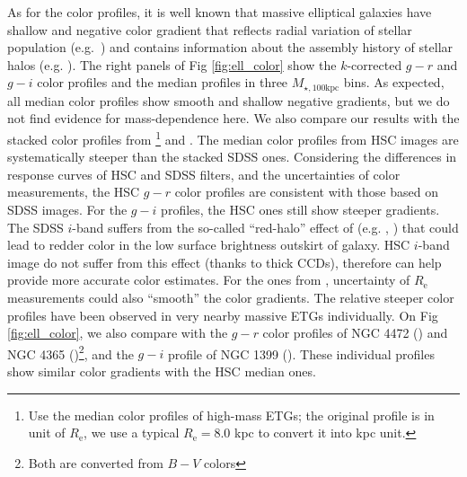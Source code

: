 \documentclass[a4paper,fleqn,usenatbib]{mnras}
\def\mtot{{$M_{\star,100\mathrm{kpc}}$}}
\begin{document}
    As for the color profiles, it is well known that massive elliptical galaxies 
    have shallow and negative color gradient that reflects radial variation of 
    stellar population (e.g.\ \citealt{Carollo1993, LaBarbera2012}) and contains 
    information about the assembly history of stellar halos (e.g. 
    \citealt{Hirschmann2015}). 
    The right panels of Fig \ref{fig:ell_color} show the $k$-corrected $g-r$ and 
    $g-i$ color profiles and the median profiles in three \mtot{} bins. 
    As expected, all median color profiles show smooth and shallow negative 
    gradients, but we do not find evidence for mass-dependence here. 
    We also compare our results with the stacked color profiles from  
    \citealt{LaBarbera2010}\footnote{Use the median color profiles of high-mass 
    ETGs; the original profile is in unit of $R_{\mathrm{e}}$, we use a typical 
    $R_{\mathrm{e}}=8.0$ kpc to convert it into kpc unit.} and 
    \citealt{DSouza2014}.
    The median color profiles from HSC images are systematically steeper than the 
    stacked SDSS ones. 
    Considering the differences in response curves of HSC and SDSS filters, and 
    the uncertainties of color measurements, the HSC $g-r$ color profiles are 
    consistent with those based on SDSS images. 
    For the $g-i$ profiles, the HSC ones still show steeper gradients. 
    The SDSS $i$-band suffers from the so-called ``red-halo'' effect of 
    (e.g. \citealt{Wu2005}, \citealt{Tal2011}) that could lead to redder color in 
    the low surface brightness outskirt of galaxy.
    HSC $i$-band image do not suffer from this effect (thanks to thick CCDs), 
    therefore can help provide more accurate color estimates.
    For the ones from \citet{LaBarbera2010}, uncertainty of $R_{\mathrm{e}}$ 
    measurements could also ``smooth'' the color gradients.
    The relative steeper color profiles have been observed in very nearby massive 
    ETGs individually.  
    On Fig \ref{fig:ell_color}, we also compare with the $g-r$ color profiles of 
    NGC 4472 (\citealt{Mihos2013}) and NGC 4365 (\citealt{Mihos2017})\footnote{
    Both are converted from $B-V$ colors}, and the $g-i$ profile of NGC 1399 
    (\citealt{Iodice2016}). 
    These individual profiles show similar color gradients with the HSC median ones.   
    
\end{document}
